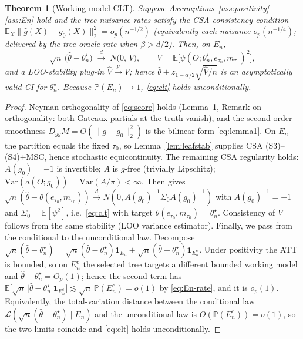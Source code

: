 \documentclass[11pt]{article}
\theoremstyle{plain}
\newtheorem{theorem}{Theorem}
\theoremstyle{definition}
\theoremstyle{remark}
\newcommand{\E}{\mathbb{E}}
\newcommand{\PP}{\mathbb{P}}
\newcommand{\Ltwo}[1]{\lVert #1 \rVert_{2}}
\newcommand{\etau}{e_{\tau_0}}
\newcommand{\mtau}{m_{\tau_0}}
\newcommand{\thstar}{\theta^{\star}_n}
\newcommand{\htheta}{\hat\theta}
\newcommand{\psiscore}{\psi}
\newcommand{\Ghat}{\hat g}
\newcommand{\gz}{g_0}
\newcommand{\odiff}{o}
\begin{document}
\begin{theorem}[Working-model CLT]\label{thm:clt}
Suppose Assumptions~\ref{ass:positivity}--\ref{ass:En} hold and the tree nuisance
rates satisfy the CSA consistency condition
$\E_X\Ltwo{\Ghat(X)-\gz(X)}^2=\odiff_p(n^{-1/2})$
(equivalently each nuisance $\odiff_p(n^{-1/4})$; delivered by the tree oracle
rate when $\beta>d/2$). Then, on $E_n$,
\begin{equation}\label{eq:clt}
  \sqrt n\,\bigl(\htheta-\thstar\bigr)\;\xrightarrow{d}\;N\!\bigl(0,\,V\bigr),
  \qquad
  V=\E\bigl[\psiscore(O;\thstar,\etau,\mtau)^2\bigr],
\end{equation}
and a LOO-stability plug-in $\hat V\xrightarrow{p}V$; hence
$\htheta\pm z_{1-\alpha/2}\sqrt{\hat V/n}$ is an asymptotically valid CI for
$\thstar$. Because $\PP(E_n)\to1$, \eqref{eq:clt} holds unconditionally.
\end{theorem}

\begin{proof}
Neyman orthogonality of \eqref{eq:score} holds (Lemma~1, Remark on
orthogonality: both Gateaux partials at the truth vanish), and the second-order
smoothness $D_{gg}M=O(\Ltwo{g-\gz}^2)$ is the bilinear form \eqref{eq:lemma1}.
On $E_n$ the partition equals the fixed $\tau_0$, so
Lemma~\ref{lem:leafstab} supplies CSA (S3)--(S4)+MSC, hence stochastic
equicontinuity. The remaining CSA regularity holds: $A(\gz)=-1$ is invertible;
$A$ is $g$-free (trivially Lipschitz); $\mathrm{Var}(a(O;\gz))=\mathrm{Var}(A/\pi)<\infty$.
Then \citet[Theorem~1]{ChenSyrgkanisAustern2022} gives
$\sqrt n(\htheta-\theta(\etau,\mtau))\xrightarrow{d}N(0,A(\gz)^{-1}\Sigma_0 A(\gz)^{-1})$
with $A(\gz)^{-1}=-1$ and $\Sigma_0=\E[\psiscore^2]$, i.e.\ \eqref{eq:clt} with
target $\theta(\etau,\mtau)=\thstar$. Consistency of $\hat V$ follows from the
same stability (LOO variance estimator). Finally, we pass from the conditional
to the unconditional law. Decompose
$\sqrt n(\htheta-\thstar)=\sqrt n(\htheta-\thstar)\mathbf{1}_{E_n}
+\sqrt n(\htheta-\thstar)\mathbf{1}_{E_n^c}$. Under positivity the ATT is
bounded, so on $E_n^c$ the selected tree targets a different bounded working
model and $\htheta-\thstar=O_p(1)$; hence the second term has
$\E\bigl[\sqrt n\,\lvert\htheta-\thstar\rvert\mathbf{1}_{E_n^c}\bigr]
\lesssim \sqrt n\,\PP(E_n^c)=\odiff(1)$ by \eqref{eq:En-rate}, and it is
$\odiff_p(1)$. Equivalently, the total-variation distance between the conditional
law $\mathcal L(\sqrt n(\htheta-\thstar)\mid E_n)$ and the unconditional law is
$O(\PP(E_n^c))=\odiff(1)$, so the two limits coincide and \eqref{eq:clt} holds
unconditionally.
\end{proof}
\end{document}
